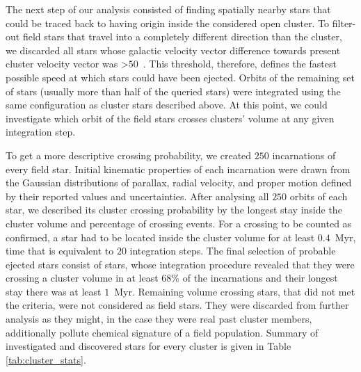 The next step of our analysis consisted of finding spatially nearby stars that could be traced back to having origin inside the considered open cluster. To filter-out field stars that travel into a completely different direction than the cluster, we discarded all stars whose galactic velocity vector difference towards present cluster velocity vector was >$50$~\kms. This threshold, therefore, defines the fastest possible speed at which stars could have been ejected. Orbits of the remaining set of stars (usually more than half of the queried stars) were integrated using the same configuration as cluster stars described above. At this point, we could investigate which orbit of the field stars crosses clusters' volume at any given integration step.

To get a more descriptive crossing probability, we created $250$ incarnations of every field star. Initial kinematic properties of each incarnation were drawn from the Gaussian distributions of parallax, radial velocity, and proper motion defined by their reported values and uncertainties. After analysing all $250$ orbits of each star, we described its cluster crossing probability by the longest stay inside the cluster volume and percentage of crossing events. For a crossing to be counted as confirmed, a star had to be located inside the cluster volume for at least $0.4$~Myr, time that is equivalent to $20$ integration steps. The final selection of probable ejected stars consist of stars, whose integration procedure revealed that they were crossing a cluster volume in at least $68$\% of the incarnations and their longest stay there was at least $1$~Myr. Remaining volume crossing stars, that did not met the criteria, were not considered as field stars. They were discarded from further analysis as they might, in the case they were real past cluster members, additionally pollute chemical signature of a field population. Summary of investigated and discovered stars for every cluster is given in Table \ref{tab:cluster_stats}.

